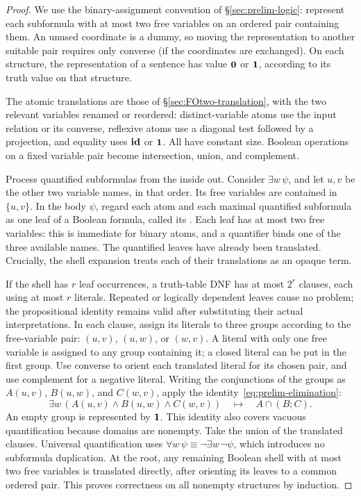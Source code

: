 \begin{proof}
We use the binary-assignment convention of \S\ref{sec:prelim-logic}:
represent each subformula with at most two free variables on an
ordered pair containing them. An unused coordinate is a dummy, so
moving the representation to another suitable pair requires only
converse (if the coordinates are exchanged). On each structure, the
representation of a sentence has value $\mathbf{0}$ or $\mathbf{1}$, according
to its truth value on that structure.

The atomic translations are those of \S\ref{sec:FOtwo-translation},
with the two relevant variables renamed or reordered: distinct-variable
atoms use the input relation or its converse, reflexive atoms use a
diagonal test followed by a projection, and equality uses $\mathbf{id}$ or
$\mathbf{1}$. All have constant size. Boolean operations on a fixed
variable pair become intersection, union, and complement.

Process quantified subformulas from the inside out. Consider
$\exists w\,\psi$, and let $u,v$ be the other two variable names, in
that order. Its free variables are contained in $\{u,v\}$.
In the body $\psi$, regard each atom and each maximal quantified
subformula as one leaf of a Boolean formula, called its .
Each leaf has at most two free variables: this is immediate for binary
atoms, and a quantifier binds one of the three available names.
The quantified leaves have already been translated. Crucially, the
shell expansion treats each of their translations as an opaque term.

If the shell has $r$ leaf occurrences, a truth-table DNF has at most
$2^r$ clauses, each using at most $r$ literals. Repeated or logically
dependent leaves cause no problem; the propositional identity remains
valid after substituting their actual interpretations. In each clause,
assign its literals to three groups according to the free-variable pair:
$(u,v)$, $(u,w)$, or $(w,v)$. A literal with only one free variable is
assigned to any group containing it; a closed literal can be put in the
first group. Use converse to orient each translated literal for its
chosen pair, and use complement for a negative literal.
Writing the conjunctions of the groups as $A(u,v)$, $B(u,w)$, and
$C(w,v)$, apply the identity~\eqref{eq:prelim-elimination}:
\[
 \exists w\,(A(u,v)\land B(u,w)\land C(w,v))
       \quad\longmapsto\quad A\cap(B;C).
\]
An empty group is represented by $\mathbf{1}$. This identity also covers
vacuous quantification because domains are nonempty.
Take the union of the translated clauses. Universal quantification uses
$\forall w\,\psi\equiv\neg\exists w\,\neg\psi$, which introduces no
subformula duplication. At the root, any remaining Boolean shell with
at most two free variables is translated directly, after orienting its
leaves to a common ordered pair. This proves correctness on all nonempty
structures by induction.


\end{proof}
